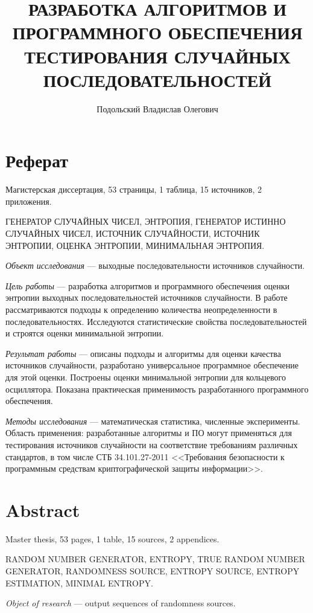 \documentclass[a4paper,12pt]{report}
\title{РАЗРАБОТКА АЛГОРИТМОВ И ПРОГРАММНОГО ОБЕСПЕЧЕНИЯ ТЕСТИРОВАНИЯ СЛУЧАЙНЫХ ПОСЛЕДОВАТЕЛЬНОСТЕЙ}
\author{Подольский Владислав Олегович}
\begin{document}
  \maketitle

  \newpage
  \chapter*{Реферат}

  Магистерская диссертация, 53 страницы, 1 таблица, 15 источников, 2 приложения.

  ГЕНЕРАТОР СЛУЧАЙНЫХ ЧИСЕЛ, ЭНТРОПИЯ, ГЕНЕРАТОР ИСТИННО СЛУЧАЙНЫХ ЧИСЕЛ, ИСТОЧНИК СЛУЧАЙНОСТИ, ИСТОЧНИК ЭНТРОПИИ, ОЦЕНКА ЭНТРОПИИ, МИНИМАЛЬНАЯ ЭНТРОПИЯ.

  \textit{Объект исследования} --- выходные последовательности источников случайности.

  \textit{Цель работы} --- разработка алгоритмов и программного обеспечения оценки энтропии выходных последовательностей источников случайности. В работе рассматриваются подходы к определению количества неопределенности в последовательностях. Исследуются статистические свойства последовательностей и строятся оценки минимальной энтропии.

  \textit{Результат работы} --- описаны подходы и алгоритмы для оценки качества источников случайности, разработано универсальное программное обеспечение для этой оценки. Построены оценки минимальной энтропии для кольцевого осциллятора. Показана практическая применимость разработанного программного обеспечения.

  \textit{Методы исследования} --- математическая статистика, численные эксперименты. Область применения: разработанные алгоритмы и ПО могут применяться для тестирования источников случайности на соответствие требованиям различных стандартов, в том числе СТБ 34.101.27-2011 <<Требования безопасности к программным средствам криптографической защиты информации>>.

  \newpage
  \chapter*{Abstract}

  Master thesis, 53 pages, 1 table, 15 sources, 2 appendices.

  RANDOM NUMBER GENERATOR, ENTROPY, TRUE RANDOM NUMBER GENERATOR, RANDOMNESS SOURCE, ENTROPY SOURCE, ENTROPY ESTIMATION, MINIMAL ENTROPY.

  \textit{Object of research} --- output sequences of randomness sources.
\end{document}
